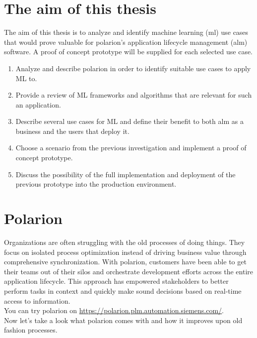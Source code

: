 \documentclass[thesis=M,english]{FITthesis}[2012/06/26]
\begin{document}
\chapter{The aim of this thesis}

The aim of this thesis is to analyze and identify machine learning (\acrshort{ml}) use cases that would prove valuable for \acrshort{polarion}’s application lifecycle management (\acrshort{alm}) software. A proof of concept prototype will be supplied for each selected use case.

\begin{enumerate}[nosep]
	\item Analyze and describe \acrshort{polarion} in order to identify suitable use cases to apply ML to. 
	\item Provide a review of ML frameworks and algorithms that are relevant for such an application.
	\item Describe several use cases for ML and define their benefit to both \acrshort{alm} as a business and the users that deploy it.
	\item Choose a scenario from the previous investigation and implement a proof of concept prototype.
	\item Discuss the possibility of the full implementation and deployment of the previous prototype into the production environment.
\end{enumerate}

\chapter{Polarion}

Organizations are often struggling with the old processes of doing things. They focus on isolated process optimization instead of driving
business value through comprehensive synchronization. With \acrshort{polarion}, customers have been able to get their teams out of their silos and orchestrate development efforts across the entire application lifecycle. This approach has empowered stakeholders to better perform tasks in context and quickly make sound decisions based on real-time access to information.\\

You can try \acrshort{polarion} on \url{https://polarion.plm.automation.siemens.com/}.\\

Now let's take a look what \acrshort{polarion} comes with and how it improves upon old fashion processes.
\end{document}
